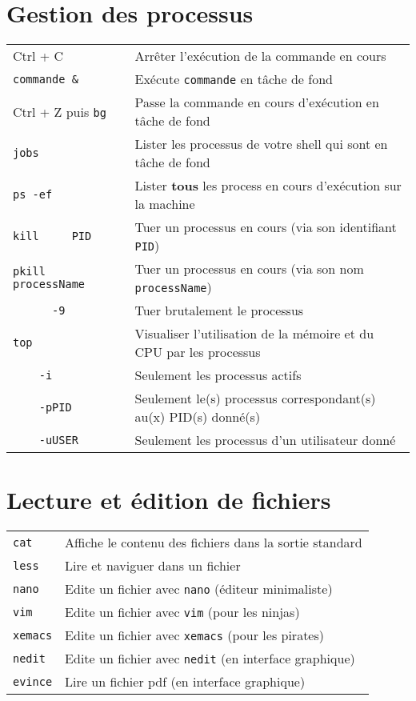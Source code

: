\documentclass [a4paper]{article}
\begin{document}
\section*{Gestion des processus}

\begin{tabular}{ ll }
\hline
{Ctrl + C}                          & Arrêter l'exécution de la commande en cours \\
\verb+commande &+                   & Exécute \verb+commande+ en tâche de fond \\
{Ctrl + Z puis \verb+bg+}           & Passe la commande en cours d'exécution en tâche de fond \\
{\verb+jobs+}                       & Lister les processus de votre shell qui sont en tâche de fond \\
{\verb+ps -ef+}                     & Lister \textbf{tous} les process en cours d'exécution sur la machine \\
{\verb+kill     PID+}               & Tuer un processus en cours (via son identifiant \verb+PID+)\\
{\verb+pkill    processName+}       & Tuer un processus en cours (via son nom \verb+processName+)\\
{\verb+      -9  + }                & Tuer brutalement le processus\\
{\verb+top+}                        & Visualiser l'utilisation de la mémoire et du CPU par les processus\\
{\verb+    -i +}                    & Seulement les processus actifs\\
{\verb+    -pPID+}                  & Seulement le(s) processus correspondant(s) au(x) PID(s) donné(s)\\
{\verb+    -uUSER+}                 & Seulement les processus d'un utilisateur donné\\

\hline
\end{tabular}


\section*{Lecture et édition de fichiers}

\begin{tabular}{ ll }
\hline
{\verb+cat+}    & Affiche le contenu des fichiers dans la sortie standard\\
{\verb+less+}   & Lire et naviguer dans un fichier\\
{\verb+nano+}   & Edite un fichier avec \verb+nano+ (éditeur minimaliste)\\
{\verb+vim+}    & Edite un fichier avec \verb+vim+ (pour les ninjas)\\
{\verb+xemacs+} & Edite un fichier avec \verb+xemacs+ (pour les pirates)\\
{\verb+nedit+}  & Edite un fichier avec \verb+nedit+ (en interface graphique)\\
{\verb+evince+} & Lire un fichier pdf (en interface graphique)\\
\hline
\end{tabular}
\end{document}
